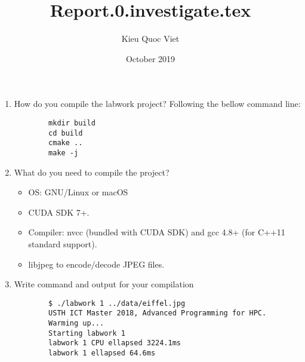 \documentclass{article}
\title{Report.0.investigate.tex}
\author{Kieu Quoc Viet }
\date{October 2019}
\begin{document}
\maketitle

\begin{enumerate}
    \item How do you compile the labwork project?
    Following the bellow command line:
    \begin{verbatim}
        mkdir build
        cd build
        cmake ..
        make -j    
    \end{verbatim}
    
    \item What do you need to compile the project?
        \begin{itemize}
            \item OS: GNU/Linux or macOS
            \item CUDA SDK 7+.
            \item Compiler: nvcc (bundled with CUDA SDK) and gcc 4.8+ (for C++11 standard support).
            \item libjpeg to encode/decode JPEG files.
        \end{itemize}
        
    \item Write command and output for your compilation
    \begin{verbatim}
        $ ./labwork 1 ../data/eiffel.jpg 
        USTH ICT Master 2018, Advanced Programming for HPC.
        Warming up...
        Starting labwork 1
        labwork 1 CPU ellapsed 3224.1ms
        labwork 1 ellapsed 64.6ms
    \end{verbatim}
    
\end{enumerate}
\end{document}
